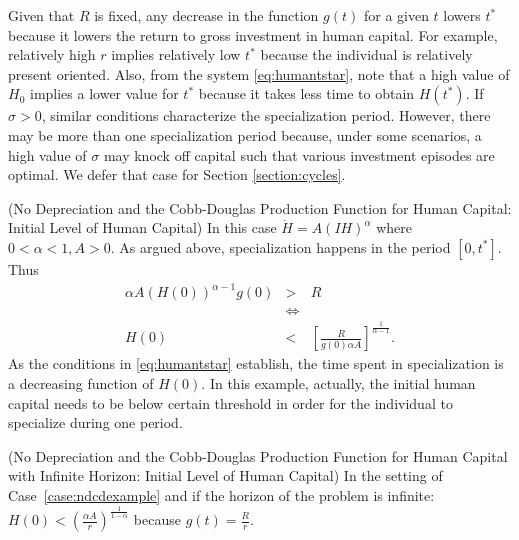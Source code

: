 \indent Given that $R$ is fixed, any decrease in the function $g(t)$ for a given $t$ lowers $t^*$ because it lowers the return to gross investment in human capital. For example, relatively high $r$ implies relatively low $t^*$ because the individual is relatively present oriented. Also, from the system \eqref{eq:humantstar}, note that a high value of $H_0$ implies a lower value for $t^*$ because it takes less time to obtain $H(t^*)$. If $\sigma > 0 $, similar conditions characterize the specialization period. However, there may be more than one specialization period because, under some scenarios, a high value of $\sigma$ may knock off capital such that various investment episodes are optimal. We defer that case for Section \ref{section:cycles}.
\begin{case} (No Depreciation and the Cobb-Douglas Production Function for Human Capital: Initial Level of Human Capital) \label{case:ndcdexample}
In this case $\dot{H} = A \left(IH \right)^\alpha$ where $0 < \alpha < 1, A>0$. As argued above, specialization happens in the period $[0,t^*]$. Thus
\begin{eqnarray}
	\alpha A \left( H(0) \right) ^{\alpha - 1 }g(0) &>& R \nonumber \\
	&\Leftrightarrow& \nonumber \\
	H(0) &<& \left[ \frac{R}{g(0)\alpha A} \right]^{\frac{1}{\alpha-1}} \label{eq:h0forspe}.
\end{eqnarray}
\indent As the conditions in \eqref{eq:humantstar} establish, the time spent in specialization is a decreasing function of $H(0)$. In this example, actually, the initial human capital needs to be below certain threshold in order for the individual to specialize during one period. 
\end{case}

\begin{case} (No Depreciation and the Cobb-Douglas Production Function for Human Capital with Infinite Horizon: Initial Level of Human Capital)
In the setting of Case~\ref{case:ndcdexample} and if the horizon of the problem is infinite: $H(0) < \left( \frac{\alpha A}{r} \right) ^{\frac{1}{1 - \alpha}}$ because $g(t) = \frac{R}{r}$.
\end{case}

